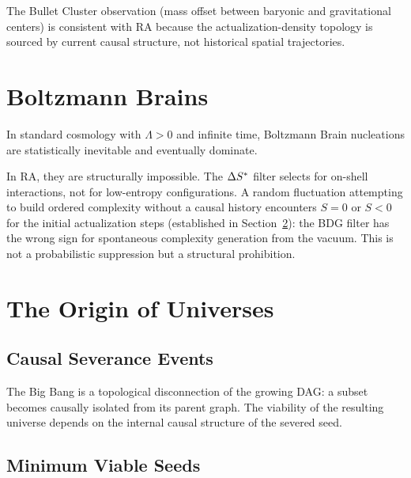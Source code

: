\documentclass[12pt,a4paper]{article}
\begin{document}
The Bullet Cluster observation (mass offset between baryonic and gravitational centers) is consistent with RA because the actualization-density topology is sourced by current causal structure, not historical spatial trajectories.

\section{Boltzmann Brains}

In standard cosmology with $\Lambda > 0$ and infinite time, Boltzmann Brain nucleations are statistically inevitable and eventually dominate.

In RA, they are structurally impossible.  The $\Delta S^*$ filter selects for on-shell interactions, not for low-entropy configurations.  A random fluctuation attempting to build ordered complexity without a causal history encounters $S = 0$ or $S < 0$ for the initial actualization steps (established in Section~\ref{sec:seeds}): the BDG filter has the wrong sign for spontaneous complexity generation from the vacuum.  This is not a probabilistic suppression but a structural prohibition.

\section{The Origin of Universes}\label{sec:seeds}

\subsection{Causal Severance Events}

The Big Bang is a topological disconnection of the growing DAG: a subset becomes causally isolated from its parent graph.  The viability of the resulting universe depends on the internal causal structure of the severed seed.

\subsection{Minimum Viable Seeds}
\end{document}
